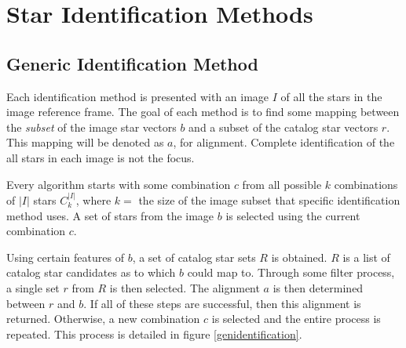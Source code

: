 \section{Star Identification Methods}


\subsection{Generic Identification Method}
Each identification method is presented with an image $I$ of all the stars in the image reference frame. The goal of each method is to find some mapping between the \textit{subset} of the image star vectors $b$ and a subset of the catalog star vectors $r$. This mapping will be denoted as $a$, for alignment. Complete identification of the all stars in each image is not the focus.

Every algorithm starts with some combination $c$ from all possible $k$ combinations of $|I|$ stars $C_k^{|I|}$, where $k = $ the size of the image subset that specific identification method uses. A set of stars from the image $b$ is selected using the current combination $c$. 

Using certain features of $b$, a set of catalog star sets $R$ is obtained. $R$ is a list of catalog star candidates as to which $b$ could map to. Through some filter process, a single set $r$ from $R$ is then selected. The alignment $a$ is then determined between $r$ and $b$. If all of these steps are successful, then this alignment is returned. Otherwise, a new combination $c$ is selected and the entire process is repeated. This process is detailed in figure \eqref{genidentification}.

\begin{figure}
\label{genidentification}
\end{figure}


